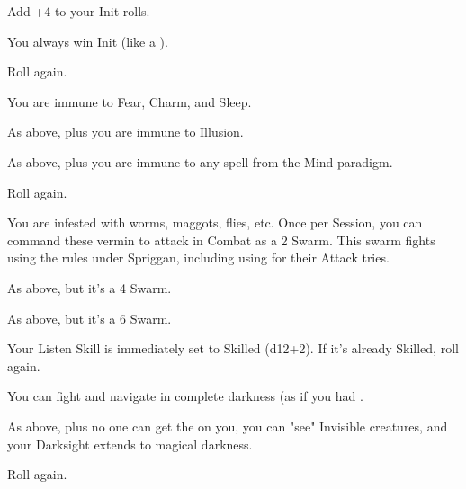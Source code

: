 \begin{multicols*}{2}


\NC[Name=Twitchy]

 Add +4 to your Init rolls.

 You always win Init (like a ).

 Roll again.


\cbreak

\NC[Name=Wut?]

 You are immune to Fear, Charm, and Sleep.

 As above, plus you are immune to Illusion.

 As above, plus you are immune to any spell from the Mind paradigm.

 Roll again.


\newpage



\NC[Name=Babies!]

 You are infested with worms, maggots, flies, etc.  Once per Session, you can command these vermin to attack in Combat as a 2 \HD Swarm.  This swarm fights using the rules under Spriggan, including using \PRE for their Attack tries.

 As above, but it's a 4 \HD Swarm.

 As above, but it's a 6 \HD Swarm.

\NC[Name=Bat Ears]

  Your Listen Skill is immediately set to Skilled (d12+2).  If it's already Skilled, roll again.

  You can fight and navigate in complete darkness (as if you had .

  As above, plus no one can get the  on you, you can "see" Invisible creatures, and your Darksight extends to magical darkness.

  Roll again.


\cbreak

\NC[Name=Beardy]
	

\end{multicols*}
